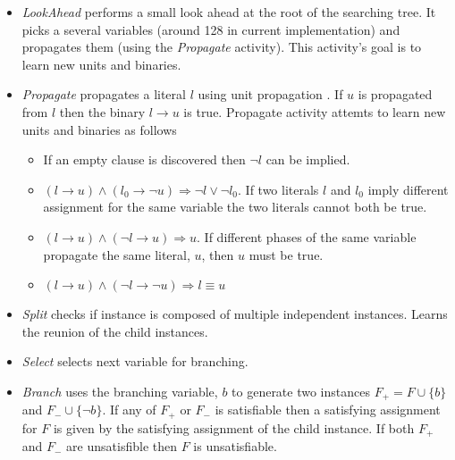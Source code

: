\begin{itemize}
  \item \emph{LookAhead} performs a small look ahead at the root
  of the searching tree. It picks a several variables (around 128 in
  current implementation) and propagates them (using the \emph{Propagate}
  activity). This activity's goal is to learn new units and binaries.

  \item \emph{Propagate} propagates a literal $l$ using
  unit propagation . If $u$ is propagated from
  $l$ then the binary $l \rightarrow u$ is true.
  Propagate activity attemts to learn new units and binaries as follows

  \begin{itemize}
    \item If an empty clause is discovered then $\neg l$ can be implied.

    \item $(l \rightarrow u) \land (l_0 \rightarrow \neg u) \Rightarrow
    \neg l \lor \neg l_0$. If two literals $l$ and $l_0$ imply different
    assignment for the same variable the two literals cannot both be true.

    \item $(l \rightarrow u) \land (\neg l \rightarrow u) \Rightarrow u$. If
    different phases of the same variable propagate the same literal, $u$,
    then $u$ must be true.

    \item $(l \rightarrow u) \land (\neg l \rightarrow \neg u)
    \Rightarrow l \equiv u$

  \end{itemize}

  \item \emph{Split} checks if instance is composed of multiple independent
  instances. Learns the reunion of the child instances.

  \item \emph{Select} selects next variable for branching. 

  \item \emph{Branch} uses the branching variable, $b$ to generate two
  instances $F_+ = F \cup \{b\}$ and $F_- \cup \{\neg b\}$. If any of
  $F_+$ or $F_-$ is satisfiable then a satisfying assignment for
  $F$ is given by the satisfying assignment of the child instance.
  If both $F_+$ and $F_-$ are unsatisfible then $F$ is unsatisfiable.


\end{itemize}
